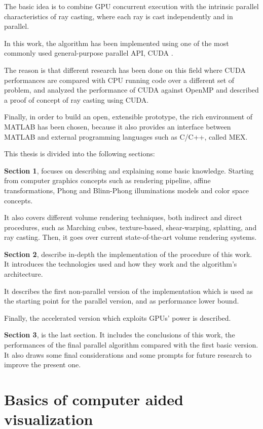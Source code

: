 \documentclass[12pt,a4paper]{extarticle}
\newcommand{\linespace}{\vspace{0pt}}
\begin{document}
The basic idea is to combine GPU concurrent execution with the intrinsic parallel characteristics of ray casting, where each ray is cast independently and in parallel.
\linespace

In this work, the algorithm has been implemented using one of the most commonly used general-purpose parallel API, CUDA \cite{nvidia:12}.

The reason is that different research has been done on this field where CUDA performances are compared with CPU running code over a different set of problem, \cite{garland:8}
and \cite{shen:9} analyzed the performance of CUDA against OpenMP and described a proof of concept of ray casting using CUDA.
\linespace

Finally, in order to build an open, extensible prototype, the rich environment of MATLAB has been chosen, because it also provides an interface between MATLAB and external programming languages such as C/C++, called MEX.
\linespace

This thesis is divided into the following sections:

\textbf{Section 1}, focuses on describing and explaining some basic knowledge. Starting from computer graphics concepts such as rendering pipeline, affine transformations, Phong and Blinn-Phong illuminations models and color space concepts.

It also covers different volume rendering techniques, both indirect and direct procedures, such as Marching cubes, texture-based, shear-warping, splatting, and ray casting. Then, it goes over current state-of-the-art volume rendering systems.

\textbf{Section 2}, describe in-depth the implementation of the procedure of this work. It introduces the technologies used and how they work and the algorithm's architecture.
 
It describes the first non-parallel version of the implementation which is used as the starting point for the parallel version, and as performance lower bound.

Finally, the accelerated version which exploits GPUs' power is described.

\textbf{Section 3}, is the last section. It includes the conclusions of this work, the performances of the final parallel algorithm compared with the first basic version. It also draws some final considerations and some prompts for future research to improve the present one.
\pagebreak
\fancyhead[L]{\nouppercase{\leftmark}}

\section{Basics of computer aided visualization}
\end{document}
